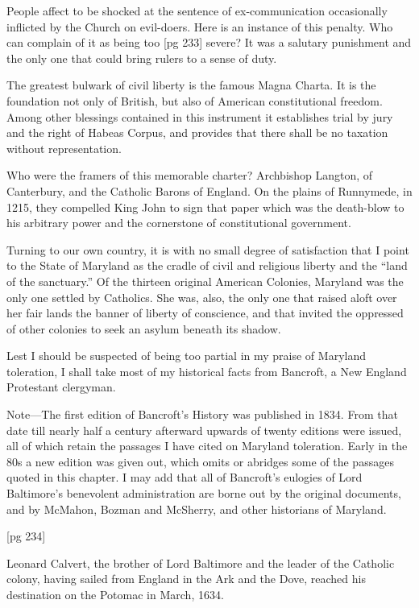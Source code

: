 People affect to be shocked at the sentence of
ex-communication occasionally inflicted by the
Church on evil-doers. Here is an instance of this
penalty. Who can complain of it as being too
[pg 233]
severe? It was a salutary punishment and the
only one that could bring rulers to a sense of duty.

The greatest bulwark of civil liberty is the
famous Magna Charta. It is the foundation not
only of British, but also of American constitutional
freedom. Among other blessings contained
in this instrument it establishes trial by jury and
the right of Habeas Corpus, and provides that
there shall be no taxation without representation.

Who were the framers of this memorable charter?
Archbishop Langton, of Canterbury, and
the Catholic Barons of England. On the plains of
Runnymede, in 1215, they compelled King John
to sign that paper which was the death-blow to his
arbitrary power and the cornerstone of constitutional
government.

Turning to our own country, it is with no small
degree of satisfaction that I point to the State of
Maryland as the cradle of civil and religious
liberty and the “land of the sanctuary.” Of the
thirteen original American Colonies, Maryland
was the only one settled by Catholics. She was,
also, the only one that raised aloft over her fair
lands the banner of liberty of conscience, and that
invited the oppressed of other colonies to seek an
asylum beneath its shadow.

Lest I should be suspected of being too partial
in my praise of Maryland toleration, I shall take
most of my historical facts from Bancroft, a New
England Protestant clergyman.

Note—The first edition of Bancroft's History was
published in 1834. From that date till nearly half a century afterward
upwards of twenty editions were issued, all of which retain
the passages I have cited on Maryland toleration. Early in
the 80s a new edition was given out, which omits or abridges
some of the passages quoted in this chapter. I may add that
all of Bancroft's eulogies of Lord Baltimore's benevolent administration
are borne out by the original documents, and by
McMahon, Bozman and McSherry, and other historians of
Maryland.

[pg 234]

Leonard Calvert, the brother of Lord Baltimore
and the leader of the Catholic colony, having
sailed from England in the Ark and the
Dove,
reached his destination on the Potomac in March,
1634.

